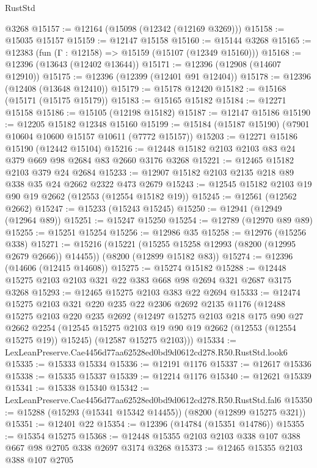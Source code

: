 \begin{lexlean}{RustStd}
\begin{coremodule}
    @3268
@15157 := @12164 (@15098 (@12342 (@12169 @3269)))
@15158 := @15035 @15157
@15159 := @12147 @15158
@15160 := @15144 @3268
@15165 := @12383 (fun (Γ : @12158) => @15159 (@15107 (@12349 @15160)))
@15168 := @12396 (@13643 (@12402 @13644))
@15171 := @12396 (@12908 (@14607 @12910))
@15175 := @12396 (@12399 (@12401 @91 @12404))
@15178 := @12396 (@12408 (@13648 @12410))
@15179 := @15178 @12420
@15182 := @15168 (@15171 (@15175 @15179))
@15183 := @15165 @15182
@15184 := @12271 @15158
@15186 := @15105 (@12198 @15182)
@15187 := @12147 @15186
@15190 := @12205 @15182 @12348 @15160
@15199 := @15184 (@15187 @15190) (@7901 @10604 @10600 @15157 @10611 (@7772 @15157))
@15203 := @12271 @15186 @15190 (@12442 @15104)
@15216 := @12448 @15182 @2103 @2103 @83 @24 @379 @669 @98 @2684 @83 @2660 @3176 @3268
@15221 := @12465 @15182 @2103 @379 @24 @2684
@15233 := @12907 @15182 @2103 @2135 @218 @89 @338 @35 @24 @2662 @2322 @473 @2679
@15243 := @12545 @15182 @2103 @19 @90 @19 @2662 (@12553 (@12554 @15182 @19))
@15245 := @12561 (@12562 @2662)
@15247 := @15233 (@15243 @15245)
@15250 := @12941 (@12949 (@12964 @89))
@15251 := @15247 @15250
@15254 := @12789 (@12970 @89 @89)
@15255 := @15251 @15254
@15256 := @12986 @35
@15258 := @12976 (@15256 @338)
@15271 := @15216
    (@15221 (@15255 @15258 @12993 (@8200 (@12995 @2679 @2666)) @14455))
    (@8200 (@12899 @15182 @83))
@15274 := @12396 (@14606 (@12415 @14608))
@15275 := @15274 @15182
@15288 := @12448 @15275 @2103 @2103 @321 @22 @383 @668 @98 @2694 @321 @2687 @3175 @3268
@15293 := @12465 @15275 @2103 @383 @22 @2694
@15333 := @12474
    @15275
    @2103
    @321
    @220
    @235
    @22
    @2306
    @2692
    @2135
    @1176
    (@12488
      @15275
      @2103
      @220
      @235
      @2692
      (@12497
        @15275
        @2103
        @218
        @175
        @90
        @27
        @2662
        @2254
        (@12545 @15275 @2103 @19 @90 @19 @2662 (@12553 (@12554 @15275 @19)) @15245)
        (@12587 @15275 @2103)))
@15334 := LexLeanPreserve.Cae4456d77aa62528ed0bd9d0612cd278.R50.RustStd.look6
@15335 := @15333 @15334
@15336 := @12191 @1176
@15337 := @12617 @15336
@15338 := @15335 @15337
@15339 := @12214 @1176
@15340 := @12621 @15339
@15341 := @15338 @15340
@15342 := LexLeanPreserve.Cae4456d77aa62528ed0bd9d0612cd278.R50.RustStd.fal6
@15350 := @15288 (@15293 (@15341 @15342 @14455)) (@8200 (@12899 @15275 @321))
@15351 := @12401 @22
@15354 := @12396 (@14784 (@15351 @14786))
@15355 := @15354 @15275
@15368 := @12448 @15355 @2103 @2103 @338 @107 @388 @667 @98 @2705 @338 @2697 @3174 @3268
@15373 := @12465 @15355 @2103 @388 @107 @2705

\end{coremodule}
\end{lexlean}
